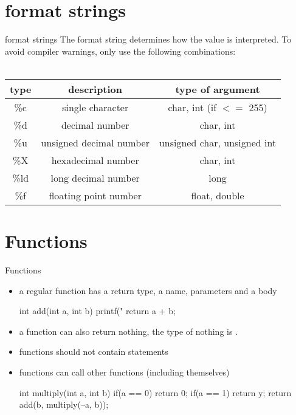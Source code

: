 \documentclass[10pt,graphics,aspectratio=169,table]{beamer}
\begin{document}
\section{format strings}
\begin{frame}{format strings}
The format string determines how the value is interpreted.
    To avoid compiler warnings, only use the following combinations: \\ \ \\
    \begin{tabular}{|c|c|c|}
        \hline
        \textbf{type} & \textbf{description} & \textbf{type of argument} \\\hline
        \%c & single character & char, int (if $<=$ 255) \\\hline
        \%d & decimal number & char, int \\\hline
        \%u & unsigned decimal number & unsigned char, unsigned int \\\hline
        \%X & hexadecimal number & char, int \\\hline
        \%ld & long decimal number & long \\\hline
        \%f & floating point number & float, double \\\hline
    \end{tabular}
\end{frame}
\section{Functions}
\begin{frame}[fragile]{Functions}
    \begin{itemize}
        \item
            a regular function has a return type, a name, parameters and a body
            \begin{codeblock}
int add(int a, int b){
    printf("%
    return a + b;
}
            \end{codeblock}
        \item
            a function can also return nothing,
            the type of nothing is .
        \item
             functions should not contain  statements
        \item
            functions can call other functions (including themselves)
            \begin{codeblock}
int multiply(int a, int b){
    if(a == 0) return 0;
    if(a == 1) return y;
    return add(b, multiply(--a, b));
}
            \end{codeblock}
    \end{itemize}

\end{frame}
\end{document}
